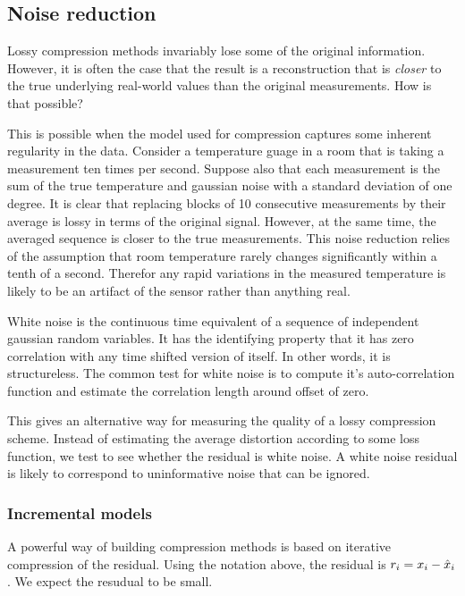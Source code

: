\subsection{Noise reduction}
Lossy compression methods invariably lose some of the original
information. However, it is often the case that the result is a
reconstruction that is {\em closer} to the true underlying real-world
values than the original measurements. How is that possible?

This is possible when the model used for compression captures some
inherent regularity in the data. Consider a temperature guage in a
room that is taking a measurement ten times per second. Suppose also
that each measurement is the sum of the true temperature and gaussian
noise with a standard deviation of one degree.  It is clear that
replacing blocks of 10 consecutive measurements by their average is
lossy in terms of the original signal. However, at the same time, the
averaged sequence is closer to the true measurements. This noise
reduction relies of the assumption that room temperature rarely
changes significantly within a tenth of a second. Therefor any rapid
variations in the measured temperature is likely to be an artifact of
the sensor rather than anything real.

White noise is the continuous time equivalent of a sequence of
independent gaussian random variables. It has the identifying property
that it has zero correlation with any time shifted version of
itself. In other words, it is structureless. The common test for white
noise is to compute it's auto-correlation function and estimate the
correlation length around offset of zero.

This gives an alternative way for measuring the quality of a lossy
compression scheme. Instead of estimating the average distortion
according to some loss function, we test to see whether the residual
is white noise. A white noise residual is likely to correspond to
uninformative noise that can be ignored.

\subsubsection{Incremental models}


A powerful way of building compression methods is based on iterative
compression of the residual. Using the notation above, the residual is 
$r_i=x_i - \hat{x}_i$. We expect the resudual to be small.

